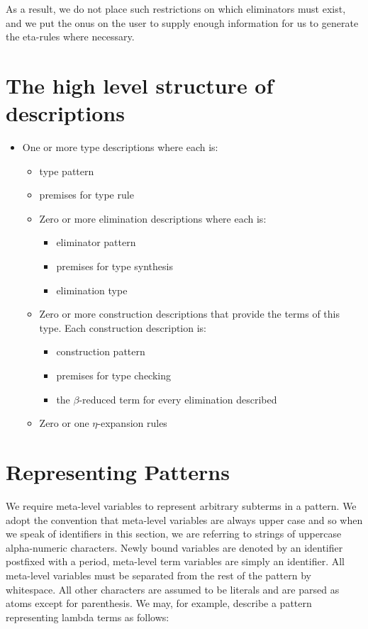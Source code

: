 As a result, we do not place such restrictions on which eliminators
must exist, and we put the onus on the user to supply enough
information for us to generate the eta-rules where necessary.

\section{The high level structure of descriptions}

\begin{itemize}
    \item One or more type descriptions where each is:
      \begin{itemize}
      \item type pattern
      \item premises for type rule
      \item Zero or more elimination descriptions where each is:
        \begin{itemize}
        \item eliminator pattern
        \item premises for type synthesis
        \item elimination type            
        \end{itemize}        
      \item Zero or more construction descriptions that provide the
        terms of this type. Each construction description is:
        \begin{itemize}
        \item construction pattern
        \item premises for type checking
        \item the $\beta$-reduced term for every elimination described
        \end{itemize}
      \item Zero or one $\eta$-expansion rules
      \end{itemize}
     
\end{itemize}

\section{Representing Patterns}

We require meta-level variables to represent arbitrary subterms in a
pattern. We adopt the convention that meta-level variables are always
upper case and so when we speak of identifiers in this section, we are
referring to strings of uppercase alpha-numeric characters. Newly bound
variables are denoted by an identifier postfixed with a period,
meta-level term variables are simply an identifier. All meta-level
variables must be separated from the rest of the pattern by
whitespace. All other characters are assumed to be literals and are
parsed as atoms except for parenthesis. We may, for example, describe
a pattern representing lambda terms as follows:

